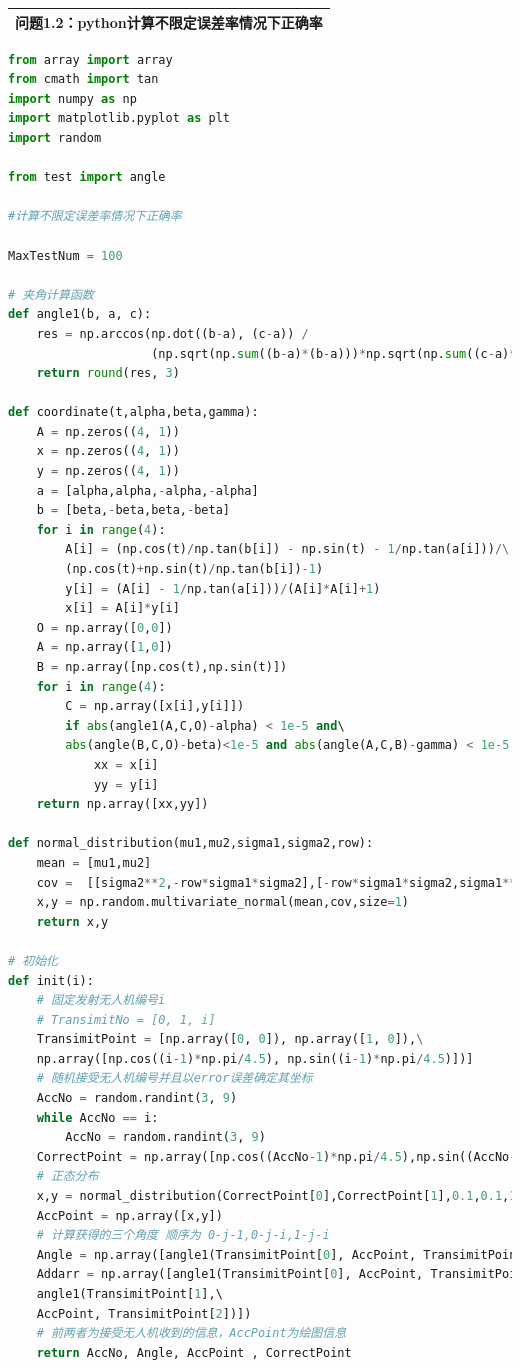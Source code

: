 \documentclass{my_paper}
\begin{document}
\begin{table}[htbp]
    \centering
    \begin{tabular}{|p{14.0cm}|}
    \hline
    \textbf{问题1.2：python计算不限定误差率情况下正确率} \\ %
    \hline
    \end{tabular}
\end{table}
\begin{lstlisting}[language=Python]
from array import array
from cmath import tan
import numpy as np
import matplotlib.pyplot as plt
import random

from test import angle

#计算不限定误差率情况下正确率

MaxTestNum = 100

# 夹角计算函数
def angle1(b, a, c):
    res = np.arccos(np.dot((b-a), (c-a)) /
                    (np.sqrt(np.sum((b-a)*(b-a)))*np.sqrt(np.sum((c-a)*(c-a)))))
    return round(res, 3)

def coordinate(t,alpha,beta,gamma):
    A = np.zeros((4, 1))
    x = np.zeros((4, 1))
    y = np.zeros((4, 1))
    a = [alpha,alpha,-alpha,-alpha]
    b = [beta,-beta,beta,-beta]
    for i in range(4):
        A[i] = (np.cos(t)/np.tan(b[i]) - np.sin(t) - 1/np.tan(a[i]))/\
        (np.cos(t)+np.sin(t)/np.tan(b[i])-1)
        y[i] = (A[i] - 1/np.tan(a[i]))/(A[i]*A[i]+1)
        x[i] = A[i]*y[i]
    O = np.array([0,0])
    A = np.array([1,0])
    B = np.array([np.cos(t),np.sin(t)])
    for i in range(4):
        C = np.array([x[i],y[i]])
        if abs(angle1(A,C,O)-alpha) < 1e-5 and\ 
        abs(angle(B,C,O)-beta)<1e-5 and abs(angle(A,C,B)-gamma) < 1e-5 :
            xx = x[i]
            yy = y[i]
    return np.array([xx,yy])

def normal_distribution(mu1,mu2,sigma1,sigma2,row):
    mean = [mu1,mu2]
    cov =  [[sigma2**2,-row*sigma1*sigma2],[-row*sigma1*sigma2,sigma1**2]]
    x,y = np.random.multivariate_normal(mean,cov,size=1)
    return x,y

# 初始化
def init(i):
    # 固定发射无人机编号i
    # TransimitNo = [0, 1, i]
    TransimitPoint = [np.array([0, 0]), np.array([1, 0]),\
    np.array([np.cos((i-1)*np.pi/4.5), np.sin((i-1)*np.pi/4.5)])]
    # 随机接受无人机编号并且以error误差确定其坐标
    AccNo = random.randint(3, 9)
    while AccNo == i:
        AccNo = random.randint(3, 9)
    CorrectPoint = np.array([np.cos((AccNo-1)*np.pi/4.5),np.sin((AccNo-1)*np.pi/4.5)])
    # 正态分布
    x,y = normal_distribution(CorrectPoint[0],CorrectPoint[1],0.1,0.1,1)
    AccPoint = np.array([x,y])
    # 计算获得的三个角度 顺序为 0-j-1,0-j-i,1-j-i
    Angle = np.array([angle1(TransimitPoint[0], AccPoint, TransimitPoint[1])])
    Addarr = np.array([angle1(TransimitPoint[0], AccPoint, TransimitPoint[2]),\
    angle1(TransimitPoint[1],\  
    AccPoint, TransimitPoint[2])])
    # 前两者为接受无人机收到的信息，AccPoint为绘图信息
    return AccNo, Angle, AccPoint , CorrectPoint


\end{lstlisting}
\end{document}
